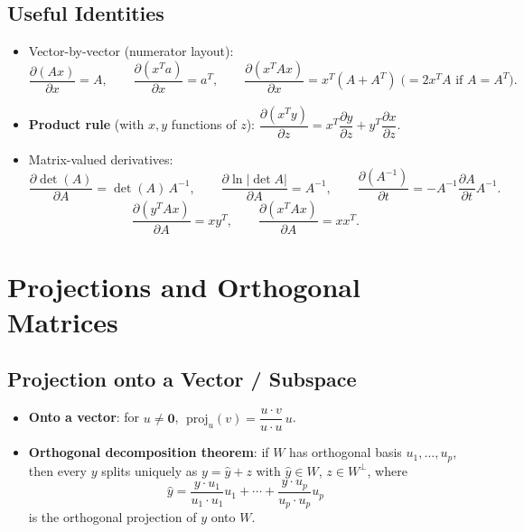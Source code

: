 \documentclass[hidelinks]{article}
\begin{document}
\subsection{Useful Identities}
\begin{itemize}
    \item Vector-by-vector (numerator layout):
    \[
        \frac{\partial(Ax)}{\partial x} = A,\qquad
        \frac{\partial(x^Ta)}{\partial x} = a^T,\qquad
        \frac{\partial(x^TAx)}{\partial x} = x^T(A + A^T)\;\big(= 2x^TA\text{ if }A=A^T\big).
    \]
    \item \textbf{Product rule} (with $x,y$ functions of $z$): $\dfrac{\partial(x^Ty)}{\partial z} = x^T\dfrac{\partial y}{\partial z} + y^T\dfrac{\partial x}{\partial z}$.
    \item Matrix-valued derivatives:
    \[
        \frac{\partial\det(A)}{\partial A} = \det(A)\,A^{-1},\qquad
        \frac{\partial\ln|\det A|}{\partial A} = A^{-1},\qquad
        \frac{\partial (A^{-1})}{\partial t} = -A^{-1}\frac{\partial A}{\partial t}A^{-1}.
    \]
    \[
        \frac{\partial(y^TAx)}{\partial A} = xy^T,\qquad
        \frac{\partial(x^TAx)}{\partial A} = xx^T.
    \]
\end{itemize}

\section{Projections and Orthogonal Matrices}

\subsection{Projection onto a Vector / Subspace}
\begin{itemize}
    \item \textbf{Onto a vector}: for $u\neq\mathbf 0$, $\;\mathrm{proj}_u(v) = \dfrac{u\cdot v}{u\cdot u}\,u$.
    \item \textbf{Orthogonal decomposition theorem}: if $W$ has orthogonal basis $u_1,\ldots,u_p$, then every $y$ splits uniquely as $y = \hat y + z$ with $\hat y\in W$, $z\in W^\perp$, where
    \[
        \hat y = \frac{y\cdot u_1}{u_1\cdot u_1}u_1 + \cdots + \frac{y\cdot u_p}{u_p\cdot u_p}u_p
    \]
    is the orthogonal projection of $y$ onto $W$.
\end{itemize}
\end{document}
